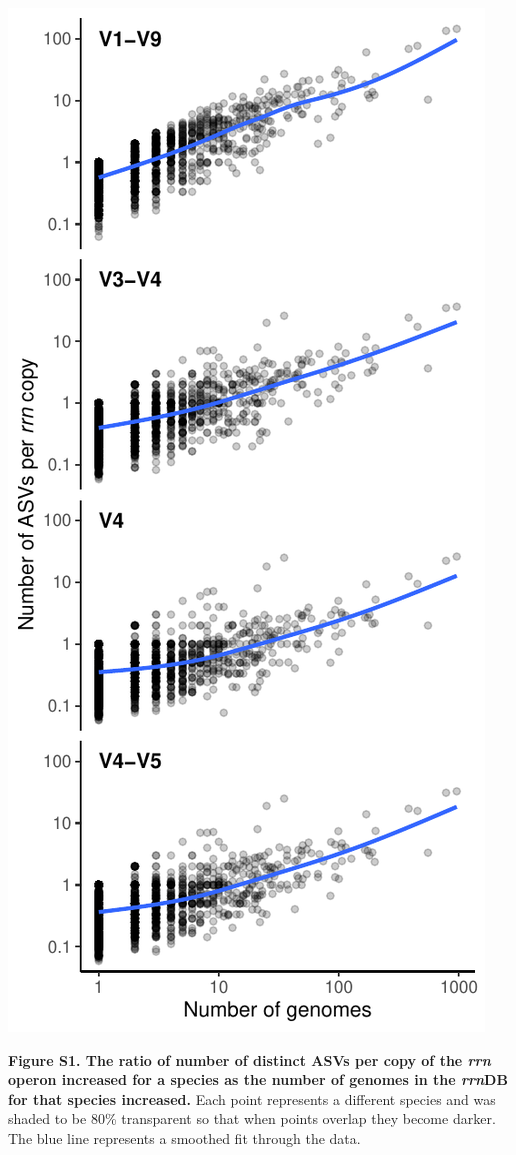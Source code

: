 \documentclass[
]{article}
\begin{document}
\newpage

\includegraphics{../figures/esv_rate.pdf}

\textbf{Figure S1. The ratio of number of distinct ASVs per copy of the
\emph{rrn} operon increased for a species as the number of genomes in
the \emph{rrn}DB for that species increased.} Each point represents a
different species and was shaded to be 80\% transparent so that when
points overlap they become darker. The blue line represents a smoothed
fit through the data.
\end{document}
